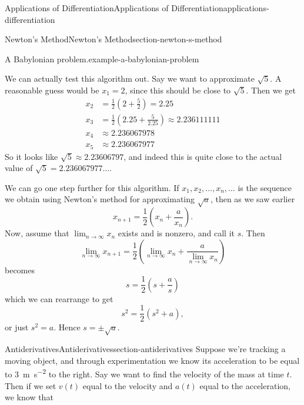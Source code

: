 \documentclass[oneside,10pt,]{book}
\numberwithin{equation}{section}
\begin{document}
\begin{chapterptx}{Applications of Differentiation}{}{Applications of Differentiation}{}{}{applications-differentiation}
\begin{sectionptx}{Newton's Method}{}{Newton's Method}{}{}{section-newton-s-method}
\begin{example}{A Babylonian problem.}{example-a-babylonian-problem}
\begin{equation*}
\end{equation*}
%
\par
\hypertarget{p-375}{}%
We can actually test this algorithm out. Say we want to approximate \(\sqrt{5}\). A reasonable guess would be \(x_{1} = 2\), since this should be close to \(\sqrt{5}\). Then we get%
\begin{align*}
x_{2} & = \frac{1}{2}\left(2 + \frac{5}{2}\right) = 2.25 \\
x_{3} & = \frac{1}{2}\left(2.25 + \frac{5}{2.25}\right) \approx 2.236111111 \\
x_{4} & \approx 2.236067978 \\
x_{5} & \approx 2.236067977 
\end{align*}
So it looks like \(\sqrt{5}\approx 2.23606797\), and indeed this is quite close to the actual value of \(\sqrt{5} = 2.236067977\ldots\).%
\par
\hypertarget{p-376}{}%
We can go one step further for this algorithm. If \(x_{1},x_{2},\ldots,x_{n},\ldots\) is the sequence we obtain using Newton's method for approximating \(\sqrt{a}\), then as we saw earlier%
\begin{equation*}
x_{n+1} = \frac{1}{2}\left(x_{n} + \frac{a}{x_{n}}\right).
\end{equation*}
Now, assume that \(\lim_{n\to\infty}x_{n}\) exists and is nonzero, and call it \(s\). Then%
\begin{equation*}
\lim_{n\to\infty}x_{n+1} = \frac{1}{2}\left(\lim_{n\to\infty}x_{n} + \frac{a}{\lim_{n\to\infty}x_{n}}\right)
\end{equation*}
becomes%
\begin{equation*}
s = \frac{1}{2}\left(s + \frac{a}{s}\right)
\end{equation*}
which we can rearrange to get%
\begin{equation*}
s^{2} = \frac{1}{2}(s^{2} + a),
\end{equation*}
or just \(s^{2} = a\). Hence \(s = \pm\sqrt{a}\).%
\end{example}
\end{sectionptx}
%
%
\typeout{************************************************}
\typeout{************************************************}
%
\begin{sectionptx}{Antiderivatives}{}{Antiderivatives}{}{}{section-antiderivatives}
\hypertarget{p-377}{}%
Suppose we're tracking a moving object, and through experimentation we know its acceleration to be equal to \SI{3}{\meter\per\second\tothe{2}} to the right. Say we want to find the velocity of the mass at time \(t\). Then if we set \(v(t)\) equal to the velocity and \(a(t)\) equal to the acceleration, we know that%

\end{sectionptx}
\end{chapterptx}
\end{document}

